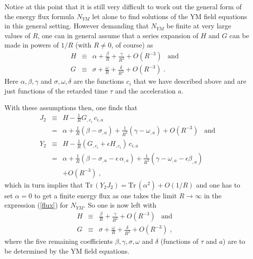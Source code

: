\documentclass[a4paper,twocolumn,prd,showpacs,amsmath,amssymb]{revtex4}
\begin{document}
Notice at this point that it is still very difficult to work out the general form
of the energy flux formula $N_{YM}$ let alone to find solutions of the YM
field equations in this general setting. However demanding that $N_{YM}$ be finite
at very large values of $R$, one can in general assume that a series expansion
of $H$ and $G$ can be made in powers of $1/R$ (with $R \neq 0$, of course) as
\begin{eqnarray*}
H & \equiv & \alpha + \frac{\beta}{R} + \frac{\gamma}{R^2} + O(R^{-3}) \;\;\; \mbox{and}
\;\;\; \\
G & \equiv & \sigma + \frac{\omega}{R} + \frac{\delta}{R^2} + O(R^{-3}) \; .
\end{eqnarray*}
Here $\alpha, \beta, \gamma$ and $\sigma, \omega, \delta$ are the
functions $c_{i}$ that we have described above and are just functions of the
retarded time $\tau$ and the acceleration $a$.

With these assumptions then, one finds that
\begin{eqnarray*}
J_2 & \equiv & H - \frac{1}{R} G_{,c_i} \, c_{i,a} \\
& = & \alpha + \frac{1}{R} (\beta - \sigma_{,a})
+ \frac{1}{R^2} (\gamma - \omega_{,a}) + O(R^{-3}) \;\;\; \mbox{and} \\
Y_2 & \equiv & H - \frac{1}{R} (G_{,c_i} + \epsilon H_{,c_i}) \, c_{i,a} \\
& = & \alpha + \frac{1}{R} (\beta - \sigma_{,a} - \epsilon \, \alpha_{,a})
+ \frac{1}{R^2} (\gamma - \omega_{,a} - \epsilon \beta_{,a}) \\
& & + O(R^{-3}) \; ,
\end{eqnarray*}
which in turn implies that $\mbox{Tr} \, (Y_2 J_2) = \mbox{Tr} \, (\alpha^2)
+ O(1/R)$ and one has to set
$\alpha =0$ to get a finite energy flux as one takes the limit $R \to \infty$
in the expression (\ref{flux}) for $N_{YM}$. So one is now left with
\begin{eqnarray}
H & \equiv & \frac{\beta}{R} + \frac{\gamma}{R^2} + O(R^{-3}) \label{hser}
\;\;\; \mbox{and} \;\;\; \\
G & \equiv & \sigma + \frac{\omega}{R} + \frac{\delta}{R^2} + O(R^{-3})
\; , \label{gser}
\end{eqnarray}
where the five remaining coefficients $\beta, \gamma, \sigma, \omega$
and $\delta$ (functions of $\tau$ and $a$) are to be determined by the YM
field equations.
\end{document}
